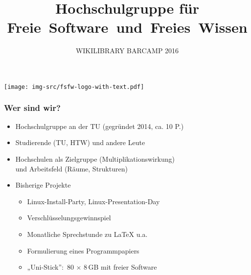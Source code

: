 \documentclass{beamer}
\title{Hochschulgruppe für Freie~Software~und~Freies~Wissen}
\subtitle{WIKILIBRARY BARCAMP 2016}
\begin{document}
\begin{frame}
  \begin{center}%
    \texttt{[image: img-src/fsfw-logo-with-text.pdf]}\\

    \vspace*{-0.5\baselineskip}

    \parbox{6cm}{\centering\inserttitle}

    \vspace*{\baselineskip}

    \structure{\Large \insertsubtitle}
  \end{center}
\end{frame}

\begin{frame}[label=ct1]
  \frametitle{Wer sind wir?}

  \onslide<+->

  \begin{itemize}
  \item Hochschulgruppe an der TU (gegründet 2014, ca. 10 P.)
  \item Studierende (TU, HTW) und andere Leute
  \item Hochschulen als Zielgruppe (Multiplikationswirkung)\\
    und Arbeitsfeld (Räume, Strukturen)

    \bigskip\onslide<+->

  \item Bisherige Projekte
    \begin{itemize}
    \item Linux-Install-Party, Linux-Presentation-Day
    \item Verschlüsselungsgewinnspiel
    \item Monatliche Sprechstunde zu \LaTeX{} u.a.
    \item Formulierung eines Programmpapiers
    \item „Uni-Stick”:~80 $\times$ 8\,GB mit freier Software
    \end{itemize}
  \end{itemize}
\end{frame}
\end{document}

